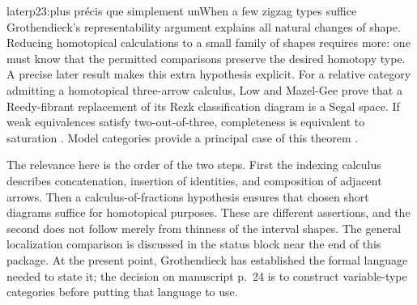 \begin{dcomment}{later}{p23:plus précis que simplement un}{When a few zigzag types suffice}
Grothendieck's representability argument explains all natural changes of shape. Reducing homotopical calculations to a small family of shapes requires more: one must know that the permitted comparisons preserve the desired homotopy type. A precise later result makes this extra hypothesis explicit. For a relative category admitting a homotopical three-arrow calculus, Low and Mazel-Gee prove that a Reedy-fibrant replacement of its Rezk classification diagram is a Segal space. If weak equivalences satisfy two-out-of-three, completeness is equivalent to saturation \citep[Theorem~4.11]{LowMazelGee2015}. Model categories provide a principal case of this theorem \citep[Corollary~4.12]{LowMazelGee2015}.

The relevance here is the order of the two steps. First the indexing calculus describes concatenation, insertion of identities, and composition of adjacent arrows. Then a calculus-of-fractions hypothesis ensures that chosen short diagrams suffice for homotopical purposes. These are different assertions, and the second does not follow merely from thinness of the interval shapes. The general localization comparison is discussed in the status block near the end of this package. At the present point, Grothendieck has established the formal language needed to state it; the decision on manuscript p.~24 is to construct variable-type categories before putting that language to use.
\end{dcomment}

